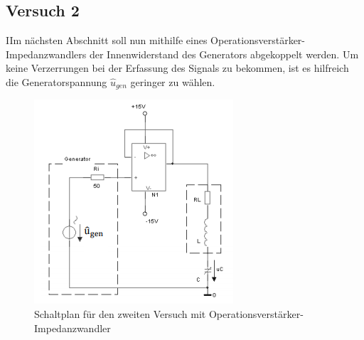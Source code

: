 \documentclass{article}
\begin{document}
\newpage

\subsection{Versuch 2}

\begin{task}
  IIm nächsten Abschnitt soll nun mithilfe eines Operationsverstärker-Impedanzwandlers
  der Innenwiderstand des Generators abgekoppelt werden. Um keine Verzerrungen bei der Erfassung
  des Signals zu bekommen, ist es hilfreich die Generatorspannung $\hat{u}_{gen}$ geringer zu wählen.
\end{task}
\begin{figure}[h]
  \begin{center}
    \includegraphics{../assets/images/ETP3/Versuch2Schaltplan.PNG}
    \caption{Schaltplan für den zweiten Versuch mit Operationsverstärker-Impedanzwandler}
  \end{center}
  \end{figure}
\end{document}
